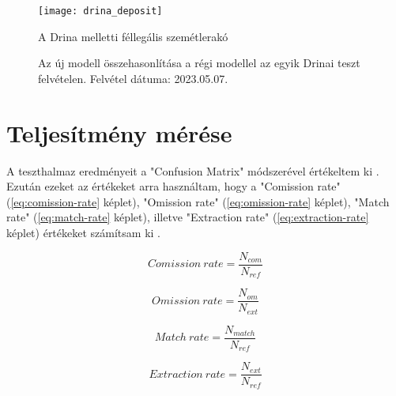 \begin{figure}[H]
	\centering
	\texttt{[image: drina\_deposit]}
	\caption{A Drina melletti féllegális szemétlerakó \cite{petkupa2024}}
    \label{fig:drina-deposit}
\end{figure}

\begin{figure}[H]
	\centering
	\hspace{5pt}
	\hspace{5pt}
	\caption{Az új modell összehasonlítása a régi modellel az egyik Drinai teszt felvételen. Felvétel dátuma: 2023.05.07.}
	\label{fig:old-vs-new}
\end{figure}

\section{Teljesítmény mérése}

A teszthalmaz eredményeit a "Confusion Matrix" módszerével értékeltem ki \cite{CONGALTON199135}. Ezután ezeket az értékeket arra használtam, hogy a "Comission rate" (\ref{eq:comission-rate} képlet), "Omission rate" (\ref{eq:omission-rate} képlet), "Match rate" (\ref{eq:match-rate} képlet), illetve "Extraction rate" (\ref{eq:extraction-rate} képlet) értékeket számítsam ki \cite{Fekete2021}.

\begin{equation}\label{eq:comission-rate}
    Comission \ rate = \frac{N_{com}}{N_{ref}}
\end{equation}

\begin{equation}\label{eq:omission-rate}
    Omission \ rate = \frac{N_{om}}{N_{ext}}
\end{equation}

\begin{equation}\label{eq:match-rate}
    Match \ rate = \frac{N_{match}}{N_{ref}}
\end{equation}

\begin{equation}\label{eq:extraction-rate}
    Extraction \ rate = \frac{N_{ext}}{N_{ref}}
\end{equation}

